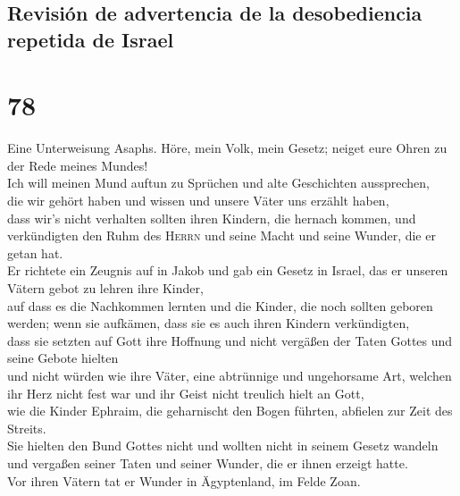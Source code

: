 \hypertarget{revisiuxf3n-de-advertencia-de-la-desobediencia-repetida-de-israel}{%
\subsection{Revisión de advertencia de la desobediencia repetida de
Israel}\label{revisiuxf3n-de-advertencia-de-la-desobediencia-repetida-de-israel}}

\hypertarget{section-77}{%
\section{78}\label{section-77}}

 Eine Unterweisung Asaphs. Höre, mein Volk, mein Gesetz;
neiget eure Ohren zu der Rede meines Mundes!\\
 Ich will meinen Mund auftun zu Sprüchen und alte
Geschichten aussprechen,\\
 die wir gehört haben und wissen und unsere Väter uns
erzählt haben,\\
 dass wir's nicht verhalten sollten ihren Kindern, die
hernach kommen, und verkündigten den Ruhm des \textsc{Herrn} und seine
Macht und seine Wunder, die er getan hat.\\
 Er richtete ein Zeugnis auf in Jakob und gab ein Gesetz
in Israel, das er unseren Vätern gebot zu lehren ihre Kinder,\\
 auf dass es die Nachkommen lernten und die Kinder, die
noch sollten geboren werden; wenn sie aufkämen, dass sie es auch ihren
Kindern verkündigten,\\
 dass sie setzten auf Gott ihre Hoffnung und nicht
vergäßen der Taten Gottes und seine Gebote hielten\\
 und nicht würden wie ihre Väter, eine abtrünnige und
ungehorsame Art, welchen ihr Herz nicht fest war und ihr Geist nicht
treulich hielt an Gott,\\
 wie die Kinder Ephraim, die geharnischt den Bogen
führten, abfielen zur Zeit des Streits.\\
 Sie hielten den Bund Gottes nicht und wollten nicht in
seinem Gesetz wandeln\\
 und vergaßen seiner Taten und seiner Wunder, die er
ihnen erzeigt hatte.\\
 Vor ihren Vätern tat er Wunder in Ägyptenland, im Felde
Zoan.\\
